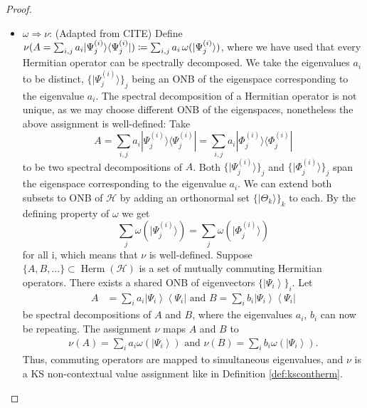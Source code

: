 \begin{proof}
\begin{itemize}
\item $\omega\Rightarrow\nu$: (Adapted from CITE) Define $\nu(A=\sum_{i,j}a_{i}|\Psi_{j}^{(i)}\rangle\langle\Psi_{j}^{(i)}|)\coloneqq\sum_{i,j}a_{i}\thinspace\omega(|\Psi_{j}^{(i)}\rangle)$, where we have used that every Hermitian operator can be spectrally decomposed. We take the eigenvalues $a_{i}$ to be distinct, $\{|\Psi_{j}^{(i)}\rangle\}_{j}$ being an ONB of the eigenspace corresponding to the eigenvalue $a_{i}$. The spectral decomposition of a Hermitian operator is not unique, as we may choose different ONB of the eigenspaces, nonetheless the above assignment is well-defined: Take
\begin{equation*}
    A=\sum_{i,j}a_{i}|\Psi_{j}^{(i)}\rangle\langle\Psi_{j}^{(i)}|=\sum_{i,j}a_{i}|\Phi_{j}^{(i)}\rangle\langle\Phi_{j}^{(i)}|
\end{equation*}
to be two spectral decompositions of $A$. Both $\{|\Psi_{j}^{(i)}\rangle\}_{j}$ and $\{|\Phi_{j}^{(i)}\rangle\}_{j}$ span the eigenspace corresponding to the eigenvalue $a_{i}$. We can extend both subsets to ONB of $\mathcal{H}$ by adding an orthonormal set $\{|\Theta_{k}\rangle\}_{k}$ to each. By the defining property of $\omega$ we get
\begin{equation*}
    \sum_{j}\omega(|\Psi_{j}^{(i)}\rangle)=\sum_{j}\omega(|\Phi_{j}^{(i)}\rangle)
\end{equation*} 
for all i, which means that $\nu$ is well-defined. Suppose $\{A,B,...\}\subset\operatorname{Herm}(\mathcal{H})$ is a set of mutually commuting Hermitian operators. There exists a shared ONB of eigenvectors $\{\left|\Psi_{i}\right\rangle \}_{i}$. Let 
\begin{align*}
    A & =\sum_{i}a_{i}\left|\Psi_{i}\right\rangle \left\langle \Psi_{i}\right| \text{ and } B =\sum_{i}b_{i}\left|\Psi_{i}\right\rangle \left\langle \Psi_{i}\right|
\end{align*}
be spectral decompositions of $A$ and $B$, where the eigenvalues $a_{i}$, $b_{i}$ can now be repeating. The assignment $\nu$ maps $A$ and $B$ to
\begin{align*}
    \nu(A) =\sum_{i}a_{i}\omega(\left|\Psi_{i}\right\rangle ) \text{ and } \nu(B)  =\sum_{i}b_{i}\omega(\left|\Psi_{i}\right\rangle ).
\end{align*}
Thus, commuting operators are mapped to simultaneous eigenvalues, and $\nu$ is a KS non-contextual value assignment like in Definition \ref{def:kscontherm}.
\end{itemize}
\end{proof}

